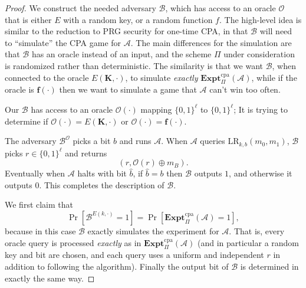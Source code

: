 \documentclass[11pt]{article}
\newcommand{\calA}{\mathcal{A}}
\newcommand{\calB}{\mathcal{B}}
\newcommand{\calO}{\mathcal{O}}
\newcommand{\bits}{\{0,1\}}
\newcommand{\bK}{\mathbf{K}}
\newcommand{\bof}{\mathbf{f}}
\newcommand{\ExptCPA}{\mathbf{Expt}^{\mathrm{cpa}}}
\newcommand{\LR}{\mathrm{LR}}
\begin{document}
\begin{proof}
    We construct the needed adversary $\calB$, which has access to an oracle
    $\calO$ that is either $E$ with a random key, or a random function $f$.
    The high-level idea is similar to the reduction to PRG security for
    one-time CPA, in that $\calB$ will need to ``simulate'' the CPA game for
    $\calA$. The main differences for the simulation are that $\calB$ has an
    oracle instead of an input, and the scheme $\Pi$ under consideration is
    randomized rather than deterministic. The similarity is that we want
    $\calB$, when connected to the oracle $E(\bK,\cdot)$, to simulate
    \emph{exactly} $\ExptCPA_{\Pi}(\calA)$, while if the oracle is
    $\bof(\cdot)$ then we want to simulate a game that $\calA$ can't win
    too often.

    Our $\calB$ has access to an oracle $\calO(\cdot)$ mapping $\bits^\ell$ to
    $\bits^\ell$; It is trying to determine if $\calO(\cdot)=E(\bK,\cdot)$
    or $\calO(\cdot)=\bof(\cdot)$.

    The adversary $\calB^\calO$
    picks a bit $b$ and runs $\calA$. 
    When $\calA$ queries $\LR_{k,b}(m_0,m_1)$,
    $\calB$ picks $r\in\bits^\ell$ and returns
    \[
        (r, \calO(r)\oplus m_B).
    \]
    Eventually when $\calA$ halts with bit $\hat{b}$, if $\hat{b}=b$ then
    $\calB$ outputs $1$, and otherwise it outputs $0$. This completes
    the description of $\calB$.

    We first claim that 
    \[
        \Pr[\calB^{E(k,\cdot)}=1] = \Pr[\ExptCPA_{\Pi}(\calA)=1],
    \]
    because in this case $\calB$ exactly simulates the experiment
    for $\calA$. That is, every oracle query is processed \emph{exactly}
    as in $\ExptCPA_{\Pi}(\calA)$ (and in particular a random key and bit are
    chosen, and each query uses a uniform and independent $r$ in addition to
    following the algorithm). Finally the output bit of $\calB$ is determined
    in exactly the same way.


\end{proof}
\end{document}
